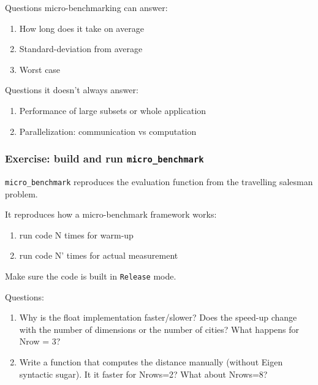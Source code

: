 Questions micro-benchmarking can answer:

\begin{enumerate}
\def\labelenumi{\arabic{enumi}.}
\itemsep1pt\parskip0pt
\item
  How long does it take on average
\item
  Standard-deviation from average
\item
  Worst case
\end{enumerate}

Questions it doesn't always answer:

\begin{enumerate}
\def\labelenumi{\arabic{enumi}.}
\itemsep1pt\parskip0pt
\item
  Performance of large subsets or whole application
\item
  Parallelization: communication vs computation
\end{enumerate}

\subsubsection{Exercise: build and run
\texttt{micro\_benchmark}}\label{exercise-build-and-run-microux5fbenchmark}

\texttt{micro\_benchmark} reproduces the evaluation function from the
travelling salesman problem.

It reproduces how a micro-benchmark framework works:

\begin{enumerate}
\def\labelenumi{\arabic{enumi}.}
\itemsep1pt\parskip0pt
\item
  run code N times for warm-up
\item
  run code N' times for actual measurement
\end{enumerate}

Make sure the code is built in \texttt{Release} mode.

Questions:

\begin{enumerate}
\def\labelenumi{\arabic{enumi}.}
\itemsep1pt\parskip0pt
\item
  Why is the float implementation faster/slower? Does the speed-up
  change with the number of dimensions or the number of cities? What
  happens for Nrow = 3?
\item
  Write a function that computes the distance manually (without Eigen
  syntactic sugar). It it faster for Nrows=2? What about Nrows=8?
\end{enumerate}

